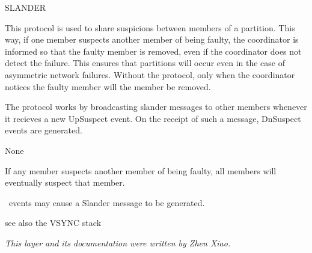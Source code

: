 \begin{Layer}{SLANDER}

This protocol is used to share suspicions between members of a partition.  This
way, if one member suspects another member of being faulty, the coordinator is
informed so that the faulty member is removed, even if the coordinator does not
detect the failure.  This ensures that partitions will occur even in the case
of asymmetric network failures.  Without the protocol, only when the
coordinator notices the faulty member will the member be removed.

\begin{Protocol}
The protocol works by broadcasting slander messages to other members whenever
it recieves a new UpSuspect event.  On the receipt of such a message, DnSuspect
events are generated.
\end{Protocol}

\begin{Parameters}
\item None
\end{Parameters} 

\begin{Properties}
\item
If any member suspects another member of being faulty, all members will
eventually suspect that member.
\item
\UpSuspect\ events may cause a Slander message to be generated.
\end{Properties}

\begin{Sources}
\end{Sources}

\begin{GenEvent}
\genevent{\DnSuspect}
\end{GenEvent}

\begin{Testing}
\item
see also the VSYNC stack
\end{Testing}

\emph{This layer and its documentation were written by Zhen Xiao.}
\end{Layer}
